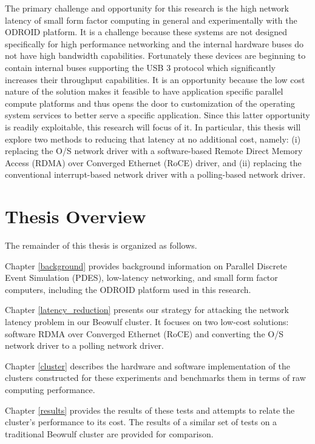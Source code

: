 \documentclass[11pt]{book}
\begin{document}
The primary challenge and opportunity for this research is the high network latency of
small form factor computing in general and experimentally with the ODROID platform.  It is
a challenge because these systems are not designed specifically for high performance
networking and the internal hardware buses do not have high bandwidth capabilities.
Fortunately these devices are beginning to contain internal buses supporting the USB 3
protocol which significantly increases their throughput capabilities.  It is an
opportunity because the low cost nature of the solution makes it feasible to have
application specific parallel compute platforms and thus opens the door to customization
of the operating system services to better serve a specific application.  Since this
latter opportunity is readily exploitable, this research will focus of it.  In particular,
this thesis will explore two methods to reducing that latency at no additional cost,
namely: (i) replacing the O/S network driver with a software-based Remote Direct Memory
Access (RDMA) over Converged Ethernet (RoCE) driver, and (ii) replacing the conventional
interrupt-based network driver with a polling-based network driver.

\section{Thesis Overview}

The remainder of this thesis is organized as follows.

Chapter \ref{background} provides background information on Parallel Discrete Event
Simulation (PDES), low-latency networking, and small form factor computers, including the
ODROID platform used in this research.

Chapter \ref{latency_reduction} presents our strategy for attacking the network latency
problem in our Beowulf cluster.  It focuses on two low-cost solutions: software RDMA over
Converged Ethernet (RoCE) and converting the O/S network driver to a polling network
driver. 

Chapter \ref{cluster} describes the hardware and software implementation of the clusters
constructed for these experiments and benchmarks them in terms of raw computing
performance.

Chapter \ref{results} provides the results of these tests and attempts to relate the
cluster's performance to its cost.  The results of a similar set of tests on a traditional
Beowulf cluster are provided for comparison.
\end{document}
